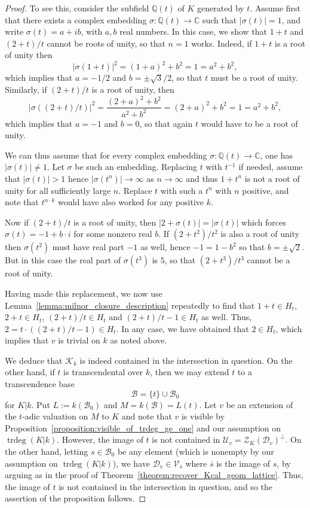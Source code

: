 \documentclass[12pt]{amsart}
\newcommand{\Qbb}{\mathbb{Q}}
\newcommand{\Cbb}{\mathbb{C}}
\newcommand{\trdeg}{\operatorname{trdeg}}
\newcommand{\Bcal}{\mathcal{B}}
\newcommand{\Vscr}{\mathscr{V}}
\newcommand{\Zcal}{\mathcal{Z}}
\newcommand{\Dcal}{\mathcal{D}}
\newcommand{\Ucal}{\mathcal{U}}
\newcommand{\Kcal}{\mathcal{K}}
\renewcommand{\bar}{\overline}
\theoremstyle{definition}
\begin{document}
\begin{proof}
  To see this, consider the subfield $\Qbb(t)$ of $K$ generated by $t$.
  Assume first that there exists a complex embedding $\sigma : \Qbb(t) \to \Cbb$ such that $|\sigma(t)| = 1$, and write $\sigma(t) = a + i b$, with $a,b$ real numbers.
  In this case, we show that $1 + t$ and $(2+t)/t$ cannot be roots of unity, so that $n = 1$ works.
  Indeed, if $1 + t$ is a root of unity then
  \[ |\sigma(1+t)|^{2} = (1+a)^{2} + b^{2} = 1 = a^{2} + b^{2}, \]
  which implies that $a = -1/2$ and $b = \pm \sqrt{3}/2$, so that $t$ must be a root of unity.
  Similarly, if $(2+t)/t$ is a root of unity, then
  \[ |\sigma((2+t)/t)|^{2} = \frac{(2+a)^{2} + b^{2}}{a^{2}+b^{2}} = (2+a)^{2} + b^{2} = 1 = a^{2} + b^{2}, \]
  which implies that $a = -1$ and $b = 0$, so that again $t$ would have to be a root of unity.

  We can thus assume that for every complex embedding $\sigma : \Qbb(t) \to \Cbb$, one has $|\sigma(t)| \neq 1$.
  Let $\sigma$ be such an embedding.
  Replacing $t$ with $t^{-1}$ if needed, assume that $|\sigma(t)| > 1$ hence $|\sigma(t^{n})| \to \infty$ as $n \to \infty$ and thus $1+t^{n}$ is not a root of unity for all sufficiently large $n$.
  Replace $t$ with such a $t^{n}$ with $n$ positive, and note that $t^{n \cdot k}$ would have also worked for any positive $k$.

  Now if $(2+t)/t$ is a root of unity, then $|2 + \sigma(t)| = |\sigma(t)|$ which forces $\sigma(t) = -1 + b \cdot i$ for some nonzero real $b$.
  If $(2+t^{2})/t^{2}$ is also a root of unity then $\sigma(t^{2})$ must have real part $-1$ as well, hence $-1 = 1 - b^{2}$ so that $b = \pm\sqrt{2}$.
  But in this case the real part of $\sigma(t^{3})$ is $5$, so that $(2 + t^{3})/t^{3}$ cannot be a root of unity.

  Having made this replacement, we now use Lemma~\ref{lemma:milnor_closure_description} repeatedly to find that $1 + t \in H_{t}$, $2 + t \in H_{t}$, $(2+t)/t \in H_{t}$ and $(2+t)/t-1 \in H_{t}$ as well.
  Thus, $2 = t \cdot ((2+t)/t - 1) \in H_{t}$.
  In any case, we have obtained that $2 \in H_{t}$, which implies that $v$ is trivial on $k$ as noted above.

  We deduce that $\Kcal_{k}$ is indeed contained in the intersection in question.
  On the other hand, if $t$ is transcendental over $k$, then we may extend $t$ to a transcendence base
  \[ \Bcal = \{t\} \cup \Bcal_{0} \]
  for $K|k$.
  Put $L := k(\Bcal_{0})$ and $M = k(\Bcal) = L(t)$.
  Let $v$ be an extension of the $t$-adic valuation on $M$ to $K$ and note that $v$ is visible by Proposition~\ref{proposition:visible_of_trdeg_ge_one} and our assumption on $\trdeg(K|k)$.
  However, the image of $t$ is not contained in $\Ucal_{v} = \Zcal_{K}(\Dcal_{v})^{\perp}$.
  On the other hand, letting $s \in \Bcal_{0}$ be any element (which is nonempty by our assumption on $\trdeg(K|k)$), we have $\Dcal_{v} \in \Vscr_{\bar s}$ where $\bar s$ is the image of $s$, by arguing as in the proof of Theorem~\ref{theorem:recover_Kcal_geom_lattice}.
  Thus, the image of $t$ is not contained in the intersection in question, and so the assertion of the proposition follows.
\end{proof}
\end{document}
